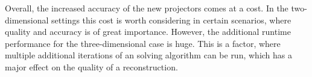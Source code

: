Overall, the increased accuracy of the new projectors comes at a cost. In the two-dimensional
settings this cost is worth considering in certain scenarios, where quality and accuracy is of great
importance. However, the additional runtime performance for the three-dimensional case is huge. This
is a factor, where multiple additional iterations of an solving algorithm can be run, which has a
major effect on the quality of a reconstruction.
